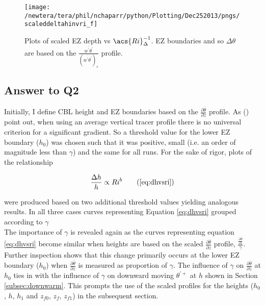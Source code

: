 \begin{figure}[htbp]
    \centering
    \texttt{[image: /newtera/tera/phil/nchaparr/python/Plotting/Dec252013/pngs/scaleddeltahinvri\_f]}
    \caption[Scaled \acs{EZ} Depth vs \acs{Ri}$^{-1}$ based on the vertical Heat Flux Profile]{Plots of scaled \acs{EZ} depth vs $\acs{Ri}_{\Delta}^{-1}$. \acs{EZ} boundaries and so $\Delta \theta$ are based on the $\frac{\overline{w^{'}\theta^{'}}}{(\overline{w^{'}\theta^{'}})_{s}}$ profile.}
    \label{fig:deltahinvri_scaled}   %
\end{figure}

\clearpage

\subsection{Answer to Q2}

Initially, I define \acs{CBL} height and \acs{EZ} boundaries based on the $\frac{\partial \overline{\theta}}{\partial z}$ profile.  As \citeauthor{BrooksFowler2} (\citeyear{BrooksFowler2}) point out, when using an average vertical tracer profile there is no universal criterion for a significant gradient.  So a threshold value for the lower \acs{EZ} boundary ($h_{0}$) was chosen such that it was positive, small (i.e. an order of magnitude less than $\gamma$) and the same for all runs.  For the sake of rigor, plots of the relationship

\begin{equation}
\frac{\Delta h}{h} \propto Ri ^{b} \tag{\ref{eq:dhvsri}}
\end{equation}

were produced based on two additional threshold values yielding analogous results.  In all three cases curves representing Equation \ref{eq:dhvsri} grouped according to $\gamma$\\

The importance of $\gamma$ is revealed again as the curves representing equation \ref{eq:dhvsri} become similar when heights are based on the scaled $\frac{\partial \overline{\theta}}{\partial z}$ profile, $\frac{\frac{\partial \overline{\theta}}{\partial z}}{\gamma}$. Further inspection shows that this change primarily occurs at the lower \acs{EZ} boundary ($h_{0}$) when $\frac{\partial \overline{\theta}}{\partial z}$ is measured as proportion of $\gamma$. The influence of $\gamma$ on $\frac{\partial \overline{\theta}}{\partial z}$ at $h_{0}$ ties in with the influence of $\gamma$ on downward moving $\theta^{'+}$ at $h$ shown in Section \ref{subsec:downwarm}.  This prompts the use of the scaled profiles for the heights ($h_{0}$, $h$, $h_{1}$ and $z_{f0}$, $z_{f}$, $z_{f1}$) in the subsequent section.\\

